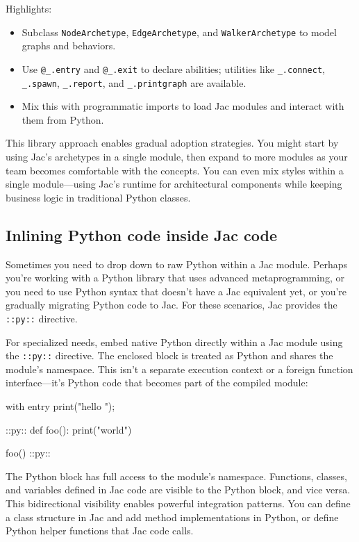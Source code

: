 Highlights:
\begin{itemize}
    \item Subclass \texttt{NodeArchetype}, \texttt{EdgeArchetype}, and \texttt{WalkerArchetype} to model graphs and behaviors.
    \item Use \texttt{@\_.entry} and \texttt{@\_.exit} to declare abilities; utilities like \texttt{\_.connect}, \texttt{\_.spawn}, \texttt{\_.report}, and \texttt{\_.printgraph} are available.
    \item Mix this with programmatic imports to load Jac modules and interact with them from Python.
\end{itemize}

This library approach enables gradual adoption strategies. You might start by using Jac's archetypes in a single module, then expand to more modules as your team becomes comfortable with the concepts. You can even mix styles within a single module—using Jac's runtime for architectural components while keeping business logic in traditional Python classes.

\subsection{Inlining Python code inside Jac code}

Sometimes you need to drop down to raw Python within a Jac module. Perhaps you're working with a Python library that uses advanced metaprogramming, or you need to use Python syntax that doesn't have a Jac equivalent yet, or you're gradually migrating Python code to Jac. For these scenarios, Jac provides the \texttt{::py::} directive.

For specialized needs, embed native Python directly within a Jac module using the \texttt{::py::} directive. The enclosed block is treated as Python and shares the module's namespace. This isn't a separate execution context or a foreign function interface—it's Python code that becomes part of the compiled module:

\begin{jacblock}
with entry {
    print("hello ");
}

::py::
def foo():
    print("world")

foo()
::py::
\end{jacblock}

The Python block has full access to the module's namespace. Functions, classes, and variables defined in Jac code are visible to the Python block, and vice versa. This bidirectional visibility enables powerful integration patterns. You can define a class structure in Jac and add method implementations in Python, or define Python helper functions that Jac code calls.


